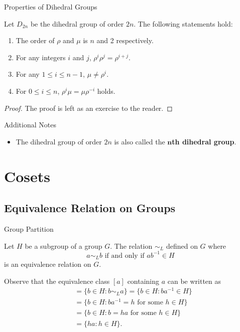 \documentclass{beamer}
\begin{document}
\begin{frame}{Properties of Dihedral Groups}
\begin{theorem}
\justifying
Let $D_{2n}$ be the dihedral group of order $2n$. The following statements hold:
\begin{enumerate}
\item The order of $\rho$ and $\mu$ is $n$ and 2 respectively.
\item For any integers $i$ and $j$, $\rho^{i}\rho^j = \rho^{i+j}$.
\item For any $1 \leq i \leq n - 1$, $\mu \neq \rho^i$.
\item For $0 \leq i \leq n$, $\rho^i\mu = \mu\rho^{-i}$ holds.
\end{enumerate}
\end{theorem}
\pause
\begin{proof}
The proof is left as an exercise to the reader.
\end{proof}
\end{frame}

\begin{frame}{Additional Notes}
\begin{itemize}
\justifying
\item The dihedral group of order $2n$ is also called the \textbf{$\boldsymbol{n}$th dihedral group}.
\end{itemize}    
\end{frame}

\section{Cosets}

\subsection{Equivalence Relation on Groups}

\begin{frame}{Group Partition}
\begin{theorem}
Let $H$ be a subgroup of a group $G$. The relation $\sim_L$ defined on $G$ where
\[
a \sim_L b \text{ if and only if } ab^{-1} \in H
\]
is an equivalence relation on $G$.
\end{theorem}
\pause
Observe that the equivalence class $[a]$ containing $a$ can be written as
\begin{align*}
[a] &= \{b \in H: b \sim_L a\} = \{b \in H: ba^{-1} \in H\} \\
&= \{b \in H: ba^{-1} = h \text{ for some } h \in H\} \\
&=  \{b \in H: b = ha \text{ for some } h \in H\} \\
&=  \{ha: h \in H\}.
\end{align*}
\end{frame}
\end{document}
